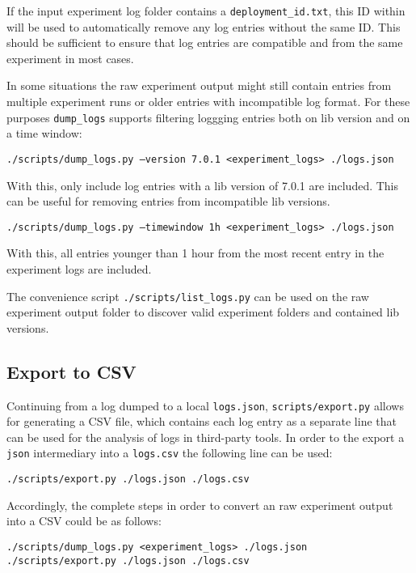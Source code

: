 \documentclass[../main.tex]{subfiles}
\begin{document}
If the input experiment log folder contains a \texttt{deployment\_id.txt}, 
this ID within will be used to automatically remove any log entries without the same ID.\@ 
This should be sufficient to ensure that log entries are compatible and from the same experiment in most cases.

In some situations the raw experiment output might still contain entries from multiple experiment runs or
older entries with incompatible log format. 
For these purposes \texttt{dump\_logs} supports filtering loggging entries both on lib version and on a time window:

\begin{tcolorbox}
  \texttt{./scripts/dump_logs.py --version 7.0.1 <experiment_logs> ./logs.json}
\end{tcolorbox}\noindent
With this, only include log entries with a lib version of 7.0.1 are included. 
This can be useful for removing entries from incompatible lib versions.
\begin{tcolorbox}
  \texttt{./scripts/dump_logs.py --timewindow 1h <experiment_logs> ./logs.json}
\end{tcolorbox}\noindent
With this, all entries younger than 1 hour from the most recent entry in the experiment logs are included.

The convenience script \texttt{./scripts/list\_logs.py} can be used on the raw experiment output folder 
to discover valid experiment folders and contained lib versions.

\subsection{Export to CSV}%
\label{sub:analysisUsageCSVExport}

Continuing from a log dumped to a local \texttt{logs.json}, \texttt{scripts/export.py} allows for generating a CSV file, 
which contains each log entry as a separate line that can be used for the analysis of logs in third-party tools.
In order to the export a \texttt{json} intermediary into a \texttt{logs.csv} the following line can be used:
\begin{tcolorbox}
  \texttt{./scripts/export.py ./logs.json ./logs.csv}
\end{tcolorbox}\noindent

Accordingly, the complete steps in order to convert an raw experiment output into a CSV could be as follows:
\begin{tcolorbox}
\begin{verbatim}
./scripts/dump_logs.py <experiment_logs> ./logs.json
./scripts/export.py ./logs.json ./logs.csv
\end{verbatim}
\end{tcolorbox}
\end{document}

